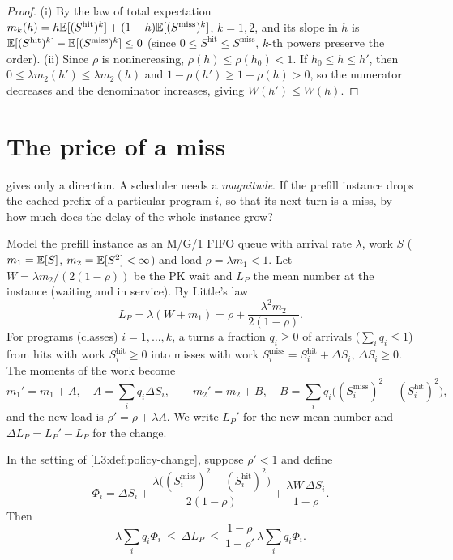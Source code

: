 \begin{proof}
(i) By the law of total expectation
$m_k(h)=h\mathbb{E}[(S^{\mathrm{hit}})^k]+(1-h)\mathbb{E}[(S^{\mathrm{miss}})^k]$, $k=1,2$, and
its slope in $h$ is $\mathbb{E}[(S^{\mathrm{hit}})^k]-\mathbb{E}[(S^{\mathrm{miss}})^k]\le0$
(since $0\le S^{\mathrm{hit}}\le S^{\mathrm{miss}}$, $k$-th powers preserve the
order).
(ii) Since $\rho$ is nonincreasing, $\rho(h)\le\rho(h_0)<1$. If
$h_0\le h\le h'$, then $0\le\lambda m_2(h')\le\lambda m_2(h)$ and
$1-\rho(h')\ge1-\rho(h)>0$, so the numerator decreases and the denominator
increases, giving $W(h')\le W(h)$.
\end{proof}

\section{The price of a miss}

 gives only a direction. A scheduler needs a \emph{magnitude}.
If the prefill instance drops the cached prefix of a particular program $i$, so that
its next turn is a miss, by how much does the delay of the whole instance grow?

\begin{definition}\label{L3:def:policy-change}
Model the prefill instance as an M/G/1 FIFO queue with arrival rate $\lambda$, work
$S$ ($m_1=\mathbb{E}[S]$, $m_2=\mathbb{E}[S^2]<\infty$) and load $\rho=\lambda m_1<1$. Let
$W=\lambda m_2/(2(1-\rho))$ be the PK wait and $L_P$ the mean number at the
instance (waiting and in service). By Little's law
\[
  L_P=\lambda(W+m_1)=\rho+\frac{\lambda^2m_2}{2(1-\rho)}.
\]
For programs (classes) $i=1,\dots,k$, a  turns a fraction
$q_i\ge0$ of arrivals ($\sum_iq_i\le1$) from hits with work
$S_i^{\mathrm{hit}}\ge0$ into misses with work
$S_i^{\mathrm{miss}}=S_i^{\mathrm{hit}}+\Delta S_i$, $\Delta S_i\ge0$. The moments of
the work become
\[
  m_1'=m_1+A,\quad A=\sum_iq_i\Delta S_i,\qquad
  m_2'=m_2+B,\quad B=\sum_iq_i\bigl((S_i^{\mathrm{miss}})^2-(S_i^{\mathrm{hit}})^2\bigr),
\]
and the new load is $\rho'=\rho+\lambda A$. We write $L_P'$ for the new mean
number and $\Delta L_P=L_P'-L_P$ for the change.
\end{definition}

\begin{theorem}\label{thm:price}
In the setting of \cref{L3:def:policy-change}, suppose $\rho'<1$ and define
\begin{equation}\label{L3:eq:price}
  \Phi_i=\Delta S_i
  +\frac{\lambda\bigl((S_i^{\mathrm{miss}})^2-(S_i^{\mathrm{hit}})^2\bigr)}{2(1-\rho)}
  +\frac{\lambda W\,\Delta S_i}{1-\rho}.
\end{equation}
Then
\[
  \lambda\sum_iq_i\Phi_i\ \le\ \Delta L_P\ \le\ \frac{1-\rho}{1-\rho'}\,\lambda\sum_iq_i\Phi_i .
\]
\end{theorem}

